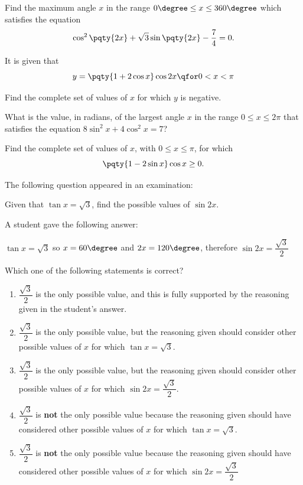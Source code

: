 \documentclass{article}
\begin{document}
\begin{example}[TMUA 2016 P1 Q8]
    Find the maximum angle \(x\) in the range \(0\degree \leq x \leq 360\degree\) which satisfies the equation
    \[
        \cos^2 \pqty{2x} + \sqrt{3} \sin \pqty{2x} - \frac{7}{4} = 0.
    \]
\end{example}

\begin{example}[TMUA 2016 P1 Q17]
    It is given that
    \[
        y = \pqty{1 + 2 \cos x} \cos 2x \qfor 0 < x < \pi
    \]

    Find the complete set of values of \(x\) for which \(y\) is negative.
\end{example}

\begin{example}[TMUA 2016 P2 Q3]
    What is the value, in radians, of the largest angle \(x\) in the range \(0 \leq x \leq 2\pi\) that satisfies the equation \(8 \sin^2 x + 4 \cos^2 x = 7\)?
\end{example}

\begin{example}[TMUA 2017 P1 Q8]
    Find the complete set of values of \(x\), with \(0 \leq x \leq \pi\), for which
    \[
        \pqty{1 - 2 \sin x} \cos x \geq 0.
    \]
\end{example}

\begin{example}[TMUA 2017 P2 Q4]
    The following question appeared in an examination:

    \indent Given that \(\tan x = \sqrt{3}\), find the possible values of \(\sin 2x\).

    A student gave the following answer:

    \indent \(\tan x = \sqrt{3}\) so \(x = 60 \degree\) and \(2x = 120 \degree\), therefore \(\sin 2x = \dfrac{\sqrt{3}}{2}\)

    Which one of the following statements is correct?

    \begin{enumerate}
        \item \(\dfrac{\sqrt{3}}{2}\) is the only possible value, and this is fully supported by the reasoning given in the student's answer.
        \item \(\dfrac{\sqrt{3}}{2}\) is the only possible value, but the reasoning given should consider other possible values of \(x\) for which \(\tan x = \sqrt{3}\).
        \item \(\dfrac{\sqrt{3}}{2}\) is the only possible value, but the reasoning given should consider other possible values of \(x\) for which \(\sin 2x = \dfrac{\sqrt{3}}{2}\).
        \item \(\dfrac{\sqrt{3}}{2}\) is \textbf{not} the only possible value because the reasoning given should have considered other possible values of \(x\) for which \(\tan x = \sqrt{3}\).
        \item \(\dfrac{\sqrt{3}}{2}\) is \textbf{not} the only possible value because the reasoning given should have considered other possible values of \(x\) for which \(\sin 2x = \dfrac{\sqrt{3}}{2}\)
    \end{enumerate}
\end{example}
\end{document}

